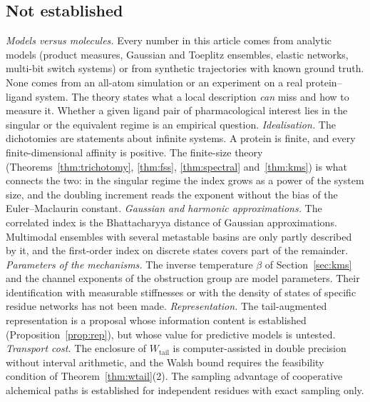 \documentclass[11pt,reqno]{amsart}
\theoremstyle{plain}
\theoremstyle{definition}
\theoremstyle{remark}
\numberwithin{equation}{section}
\newcommand{\Wtail}{W_{\mathrm{tail}}}
\begin{document}
\subsection*{Not established}
\begin{sloppypar}
\emph{Models versus molecules.} Every number in this article comes from analytic models (product measures, Gaussian and Toeplitz ensembles, elastic networks, multi-bit switch systems) or from synthetic trajectories with known ground truth. None comes from an all-atom simulation or an experiment on a real protein--ligand system. The theory states what a local description \emph{can} miss and how to measure it. Whether a given ligand pair of pharmacological interest lies in the singular or the equivalent regime is an empirical question.
\emph{Idealisation.} The dichotomies are statements about infinite systems. A protein is finite, and every finite-dimensional affinity is positive. The finite-size theory (Theorems~\ref{thm:trichotomy}, \ref{thm:fss}, \ref{thm:spectral} and~\ref{thm:kms}) is what connects the two: in the singular regime the index grows as a power of the system size, and the doubling increment reads the exponent without the bias of the Euler--Maclaurin constant.
\emph{Gaussian and harmonic approximations.} The correlated index is the Bhattacharyya distance of Gaussian approximations. Multimodal ensembles with several metastable basins are only partly described by it, and the first-order index on discrete states covers part of the remainder.
\emph{Parameters of the mechanisms.} The inverse temperature $\beta$ of Section~\ref{sec:kms} and the channel exponents of the obstruction group are model parameters. Their identification with measurable stiffnesses or with the density of states of specific residue networks has not been made.
\emph{Representation.} The tail-augmented representation is a proposal whose information content is established (Proposition~\ref{prop:rep}), but whose value for predictive models is untested.
\emph{Transport cost.} The enclosure of $\Wtail$ is computer-assisted in double precision without interval arithmetic, and the Walsh bound requires the feasibility condition of Theorem~\ref{thm:wtail}(2). The sampling advantage of cooperative alchemical paths is established for independent residues with exact sampling only.
\end{sloppypar}
\end{document}
